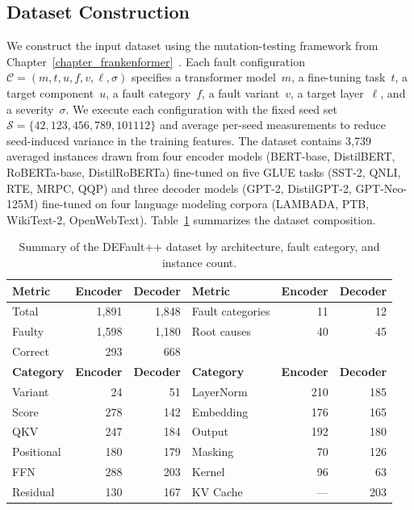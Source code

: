\subsection{Dataset Construction}
\label{sec:defaultpp_dataset}

We construct the input dataset using the mutation-testing framework from Chapter~\ref{chapter_frankenformer}~\cite{frankenformer}. Each fault configuration $\mathcal{C} = (m, t, u, f, v, \ell, \sigma)$ specifies a transformer model~$m$, a fine-tuning task~$t$, a target component~$u$, a fault category~$f$, a fault variant~$v$, a target layer~$\ell$, and a severity~$\sigma$. We execute each configuration with the fixed seed set $\mathcal{S} = \{42, 123, 456, 789, 101112\}$ and average per-seed measurements to reduce seed-induced variance in the training features. The dataset contains 3{,}739 averaged instances drawn from four encoder models (BERT-base, DistilBERT, RoBERTa-base, DistilRoBERTa) fine-tuned on five GLUE tasks (SST-2, QNLI, RTE, MRPC, QQP) and three decoder models (GPT-2, DistilGPT-2, GPT-Neo-125M) fine-tuned on four language modeling corpora (LAMBADA, PTB, WikiText-2, OpenWebText). Table~\ref{tab:data_accounting} summarizes the dataset composition.

\begin{table}[t]
\centering
\caption{Summary of the DEFault++ dataset by architecture, fault category, and instance count.}
\label{tab:data_accounting}
\begin{tabular}{@{} lrr @{\hspace{2em}} lrr @{}}
\toprule
\textbf{Metric} & \textbf{Encoder} & \textbf{Decoder} & \textbf{Metric} & \textbf{Encoder} & \textbf{Decoder} \\
\midrule
Total   & 1{,}891 & 1{,}848 & Fault categories & 11 & 12 \\
Faulty  & 1{,}598 & 1{,}180 & Root causes      & 40 & 45 \\
Correct & 293     & 668     &                  &    &    \\
\midrule
\textbf{Category} & \textbf{Encoder} & \textbf{Decoder} & \textbf{Category} & \textbf{Encoder} & \textbf{Decoder} \\
\midrule
Variant    & 24  & 51  & LayerNorm & 210 & 185 \\
Score      & 278 & 142 & Embedding & 176 & 165 \\
QKV        & 247 & 184 & Output    & 192 & 180 \\
Positional & 180 & 179 & Masking   & 70  & 126 \\
FFN        & 288 & 203 & Kernel    & 96  & 63  \\
Residual   & 130 & 167 & KV Cache  & --- & 203 \\
\bottomrule
\end{tabular}
\end{table}


